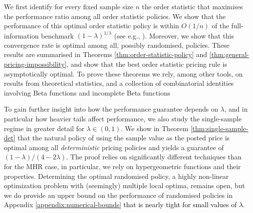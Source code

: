\documentclass[11pt]{article}
\newcommand{\brown}[1]{\textcolor{black}{#1}}
\begin{document}
We first identify for every fixed sample size $n$ the order statistic that maximises the performance ratio among all order statistic policies.
We show that the performance of this optimal order statistic policy is within $O(1/n)$ of the full-information benchmark $(1-\lambda)^{1/\lambda}$ (see e.g., \cite[Lemma 9]{cole2017applications}). Moreover, we show that this convergence rate is optimal among all, possibly randomised, policies.
These results are summarised in Theorems \ref{thm:order-statistic-policy} and \ref{thm:general-pricing-impossibility}, and show that the best order statistic pricing rule is asymptotically optimal.
To prove these theorems we rely, among other tools, on results from theoretical statistics, and a collection of combinatorial identities involving {Beta functions \cite[Section 6.2]{abramowitz1948handbook} and incomplete Beta functions \cite[Section 6.6]{abramowitz1948handbook}}


{To gain further insight into how the performance guarantee depends on $\lambda$, and in particular how heavier tails affect performance, we also study the single-sample regime in greater detail for $\lambda\in(0,1)$.}
We show in Theorem \ref{thm:single-sample-det} that the natural policy of using the sample value as the posted price
is optimal among all \textit{deterministic} pricing policies and yields a guarantee of $(1-\lambda)/(4-2\lambda)$. 
The proof relies on significantly different techniques than for the MHR case, {in particular, we rely on hypergeometric functions and their properties.} 
Determining the optimal randomised policy, a highly non-linear optimization problem with (seemingly) multiple local optima, remains open, but we do provide an upper bound on the performance of randomised policies in Appendix \ref{appendix:numerical-bounds} \brown{that is nearly tight for small values of $\lambda$}. 
\end{document}
